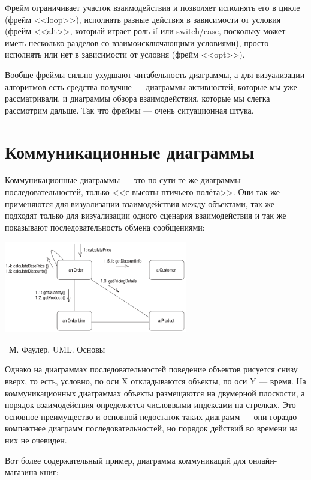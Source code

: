 \documentclass[a5paper]{article}
\newcommand{\attribution}[1] {
	\vspace{-5mm}\begin{flushright}\begin{scriptsize}%
	{\textcopyright\, #1}\end{scriptsize}\end{flushright}
}
\begin{document}
Фрейм ограничивает участок взаимодействия и позволяет исполнять его в цикле (фрейм <<loop>>), исполнять разные действия в зависимости от условия (фрейм <<alt>>, который играет роль if или switch/case, поскольку может иметь несколько разделов со взаимоисключающими условиями), просто исполнять или нет в зависимости от условия (фрейм <<opt>>).

Вообще фреймы сильно ухудшают читабельность диаграммы, а для визуализации алгоритмов есть средства получше --- диаграммы активностей, которые мы уже рассматривали, и диаграммы обзора взаимодействия, которые мы слегка рассмотрим дальше. Так что фреймы --- очень ситуационная штука.

\section{Коммуникационные диаграммы}

Коммуникационные диаграммы --- это по сути те же диаграммы последовательностей, только <<с высоты птичьего полёта>>. Они так же применяются для визуализации взаимодействия между объектами, так же подходят только для визуализации одного сценария взаимодействия и так же показывают последовательность обмена сообщениями:

\begin{center}
	\includegraphics[width=0.6\textwidth]{communicationDiagram.png}
	\attribution{М. Фаулер, UML. Основы}
\end{center}

Однако на диаграммах последовательностей поведение объектов рисуется снизу вверх, то есть, условно, по оси X откладываются объекты, по оси Y --- время. На коммуникационных диаграммах объекты размещаются на двумерной плоскости, а порядок взаимодействия определяется числоввыми индексами на стрелках. Это основное преимущество и основной недостаток таких диаграмм --- они гораздо компактнее диаграмм последовательностей, но порядок действий во времени на них не очевиден.

Вот более содержательный пример, диаграмма коммуникаций для онлайн-магазина книг:
\end{document}
